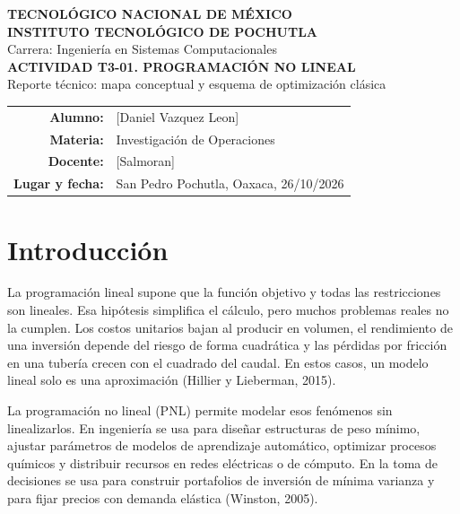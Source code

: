 \documentclass[12pt,letterpaper]{article}
\begin{document}
\begin{center}
	{\Large \textbf{TECNOLÓGICO NACIONAL DE MÉXICO}} \\[0.3cm]
	{\Large \textbf{INSTITUTO TECNOLÓGICO DE POCHUTLA}} \\[0.3cm]
	{\large Carrera: Ingeniería en Sistemas Computacionales} \\[1.5cm]

	{\LARGE \textbf{ACTIVIDAD T3-01. PROGRAMACIÓN NO LINEAL}} \\[0.5cm]
	{\large Reporte técnico: mapa conceptual y esquema de optimización clásica} \\[2cm]

	\begin{tabular}{rl}
		\textbf{Alumno:}        & [Daniel Vazquez Leon]                  \\
		\textbf{Materia:}       & Investigación de Operaciones           \\
		\textbf{Docente:}       & [Salmoran]                             \\
		\textbf{Lugar y fecha:} & San Pedro Pochutla, Oaxaca, 26/10/2026 \\
	\end{tabular}
\end{center}
\thispagestyle{empty}
\newpage

\tableofcontents
\newpage

\section{Introducción}

La programación lineal supone que la función objetivo y todas las restricciones son lineales. Esa hipótesis simplifica el cálculo, pero muchos problemas reales no la cumplen. Los costos unitarios bajan al producir en volumen, el rendimiento de una inversión depende del riesgo de forma cuadrática y las pérdidas por fricción en una tubería crecen con el cuadrado del caudal. En estos casos, un modelo lineal solo es una aproximación (Hillier y Lieberman, 2015).

La programación no lineal (PNL) permite modelar esos fenómenos sin linealizarlos. En ingeniería se usa para diseñar estructuras de peso mínimo, ajustar parámetros de modelos de aprendizaje automático, optimizar procesos químicos y distribuir recursos en redes eléctricas o de cómputo. En la toma de decisiones se usa para construir portafolios de inversión de mínima varianza y para fijar precios con demanda elástica (Winston, 2005).
\end{document}

